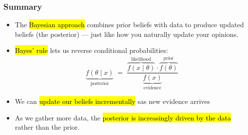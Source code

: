 \documentclass[slidestop,compress,mathserif]{beamer}
\begin{document}
\begin{frame}
\frametitle{Summary}

\begin{itemize}
\item The \hl{Bayesian approach} combines prior beliefs with data to produce updated beliefs (the posterior) --- just like how you naturally update your opinions.
\pause
\item \hl{Bayes' rule} lets us reverse conditional probabilities:
    \[
    \underbrace{f(\theta \mid x)}_{\text{posterior}} \;=\; \frac{\overbrace{f(x\mid\theta)}^{\text{likelihood}} \cdot \overbrace{f(\theta)}^{\text{prior}}}{\underbrace{f(x)}_{\text{evidence}}} 
    \]
\pause
\item We can \hl{update our beliefs incrementally} sas new evidence arrives 
\pause 
\item As we gather more data, the \hl{posterior is increasingly driven by the data} rather than the prior.

\end{itemize}

\end{frame}

\end{document}
